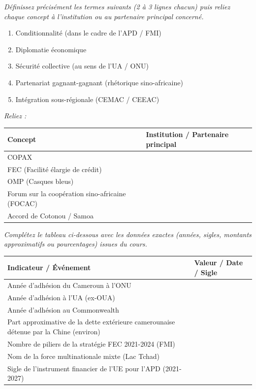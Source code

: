 \documentclass[11pt]{article}
\newcommand{\cle}[1]{{\popxbold\color{popdark}#1}}
\begin{document}
\begin{exercice}
\emph{Définissez précisément les termes suivants (2 à 3 lignes chacun) puis reliez chaque concept à l'institution ou au partenaire principal concerné.}
\begin{enumerate}
    \item \cle{Conditionnalité} (dans le cadre de l'APD / FMI)
    \item \cle{Diplomatie économique}
    \item \cle{Sécurité collective} (au sens de l'UA / ONU)
    \item \cle{Partenariat gagnant-gagnant} (rhétorique sino-africaine)
    \item \cle{Intégration sous-régionale} (CEMAC / CEEAC)
\end{enumerate}
\emph{Reliez :}
\begin{center}
\begin{tabularx}{\linewidth}{|l|X|}\hline
Concept & Institution / Partenaire principal \\ \hline
COPAX & \\ \hline
FEC (Facilité élargie de crédit) & \\ \hline
OMP (Casques bleus) & \\ \hline
Forum sur la coopération sino-africaine (FOCAC) & \\ \hline
Accord de Cotonou / Samoa & \\ \hline
\end{tabularx}
\end{center}
\end{exercice}

\begin{exercice}
\emph{Complétez le tableau ci-dessous avec les données exactes (années, sigles, montants approximatifs ou pourcentages) issues du cours.}
\begin{center}
\begin{tabularx}{\linewidth}{|l|X|}\hline
\textbf{Indicateur / Événement} & \textbf{Valeur / Date / Sigle} \\ \hline
Année d'adhésion du Cameroun à l'ONU & \\ \hline
Année d'adhésion à l'UA (ex-OUA) & \\ \hline
Année d'adhésion au Commonwealth & \\ \hline
Part approximative de la dette extérieure camerounaise détenue par la Chine (environ) & \\ \hline
Nombre de piliers de la stratégie FEC 2021-2024 (FMI) & \\ \hline
Nom de la force multinationale mixte (Lac Tchad) & \\ \hline
Sigle de l'instrument financier de l'UE pour l'APD (2021-2027) & \\ \hline
\end{tabularx}
\end{center}
\end{exercice}
\end{document}
